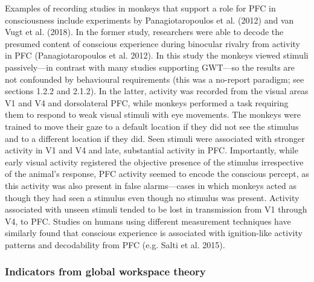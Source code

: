 \documentclass[12pt]{article}
\begin{document}
Examples of recording studies in monkeys that support a role for PFC in consciousness include experiments by Panagiotaropoulos et al. (2012) and van Vugt et al. (2018). In the former study, researchers were able to decode the presumed content of conscious experience during binocular rivalry from activity in PFC (Panagiotaropoulos et al. 2012). In this study the monkeys viewed stimuli passively—in contrast with many studies supporting GWT—so the results are not confounded by behavioural requirements (this was a no-report paradigm; see sections 1.2.2 and 2.1.2). In the latter, activity was recorded from the visual areas V1 and V4 and dorsolateral PFC, while monkeys performed a task requiring them to respond to weak visual stimuli with eye movements. The monkeys were trained to move their gaze to a default location if they did not see the stimulus and to a different location if they did. Seen stimuli were associated with stronger activity in V1 and V4 and late, substantial activity in PFC. Importantly, while early visual activity registered the objective presence of the stimulus irrespective of the animal’s response, PFC activity seemed to encode the conscious percept, as this activity was also present in false alarms—cases in which monkeys acted as though they had seen a stimulus even though no stimulus was present. Activity associated with unseen stimuli tended to be lost in transmission from V1 through V4, to PFC. Studies on humans using different measurement techniques have similarly found that conscious experience is associated with ignition-like activity patterns and decodability from PFC (e.g. Salti et al. 2015).

\subsubsection{Indicators from global workspace theory}
\end{document}

